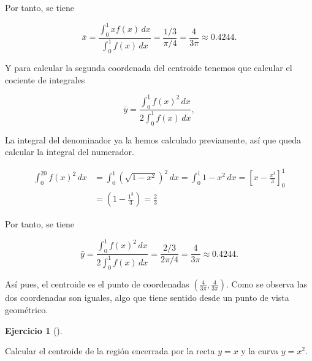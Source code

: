 \documentclass[
  a4paper,
]{scrreport}
\theoremstyle{definition}
\newtheorem{exercise}{Ejercicio}[chapter]
\theoremstyle{remark}
\begin{document}
\begin{tcolorbox}
Por tanto, se tiene

\[
\bar x = \frac{\int_0^{1} x f(x)\,dx}{\int_0^{1}f(x)\,dx}
= \frac{1/3}{\pi/4} 
= \frac{4}{3\pi}
\approx 0.4244.
\]

Y para calcular la segunda coordenada del centroide tenemos que calcular
el cociente de integrales

\[
\bar y = \frac{\int_0^1 f(x)^2\,dx}{2\int_0^1f(x)\,dx}, 
\]

La integral del denominador ya la hemos calculado previamente, así que
queda calcular la integral del numerador.

\begin{align*}
\int_0^{20} f(x)^2\,dx 
&= \int_0^1 (\sqrt{1-x^2})^2 \,dx
= \int_0^1 1-x^2 \,dx
= \left[x-\frac{x^3}{3}\right]_0^1 \\
&= \left(1-\frac{1^3}{3}\right) 
= \frac{2}{3}
\end{align*}

Por tanto, se tiene

\[
\bar y = \frac{\int_0^1 f(x)^2\,dx}{2\int_0^1f(x)\,dx}
= \frac{2/3}{2\pi/4}
= \frac{4}{3\pi}
\approx 0.4244.
\]

Así pues, el centroide es el punto de coordenadas
\(\left(\frac{4}{3\pi}, \frac{4}{3\pi}\right)\). Como se observa las dos
coordenadas son iguales, algo que tiene sentido desde un punto de vista
geométrico.

\end{tcolorbox}

\begin{exercise}[]\protect\hypertarget{exr-centro-masas-3}{}\label{exr-centro-masas-3}

Calcular el centroide de la región encerrada por la recta \(y=x\) y la
curva \(y=x^2\).

\end{exercise}
\end{document}
